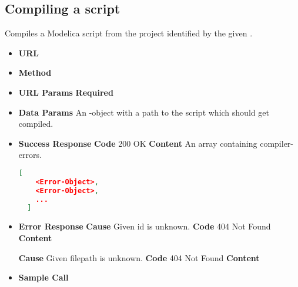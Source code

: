 \subsection{Compiling a script}
Compiles a Modelica script from the project identified by the given .

\begin{itemize}
\item \textbf{URL} 
\item \textbf{Method} 

\item \textbf{URL Params}
  \newline\textbf{Required} 

\item \textbf{Data Params} An -object with a path to the script which
  should get compiled.

\item \textbf{Success Response}
  \newline\textbf{Code} 200 OK
  \newline\textbf{Content} An array containing compiler-errors.
  \begin{lstlisting}[basicstyle=\small,language=json]
  [
    <Error-Object>,
    <Error-Object>,
    ...
  ]
  \end{lstlisting}

\item \textbf{Error Response}
  \newline\textbf{Cause} Given id is unknown.
  \newline\textbf{Code} 404 Not Found
  \newline\textbf{Content} 

  \fixedspace\textbf{Cause} Given filepath is unknown.
  \newline\textbf{Code} 404 Not Found
  \newline\textbf{Content} 
\item \textbf{Sample Call}
\end{itemize}
